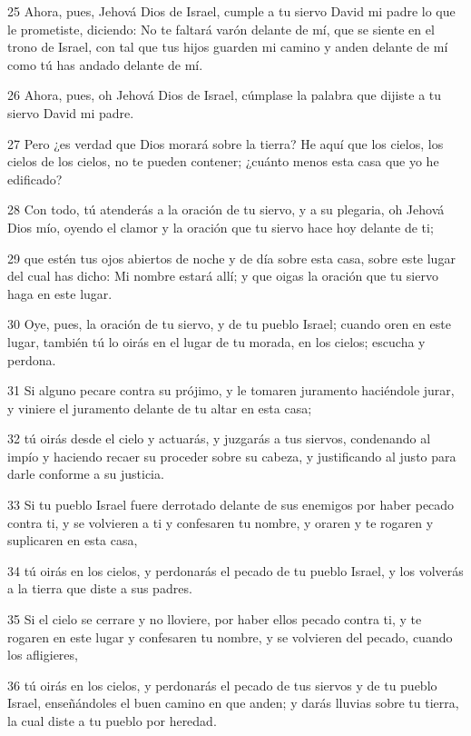 \par 25 Ahora, pues, Jehová Dios de Israel, cumple a tu siervo David mi padre lo que le prometiste, diciendo: No te faltará varón delante de mí, que se siente en el trono de Israel, con tal que tus hijos guarden mi camino y anden delante de mí como tú has andado delante de mí.
\par 26 Ahora, pues, oh Jehová Dios de Israel, cúmplase la palabra que dijiste a tu siervo David mi padre.
\par 27 Pero ¿es verdad que Dios morará sobre la tierra? He aquí que los cielos, los cielos de los cielos, no te pueden contener; ¿cuánto menos esta casa que yo he edificado? 
\par 28 Con todo, tú atenderás a la oración de tu siervo, y a su plegaria, oh Jehová Dios mío, oyendo el clamor y la oración que tu siervo hace hoy delante de ti;
\par 29 que estén tus ojos abiertos de noche y de día sobre esta casa, sobre este lugar del cual has dicho: Mi nombre estará allí; y que oigas la oración que tu siervo haga en este lugar.
\par 30 Oye, pues, la oración de tu siervo, y de tu pueblo Israel; cuando oren en este lugar, también tú lo oirás en el lugar de tu morada, en los cielos; escucha y perdona.
\par 31 Si alguno pecare contra su prójimo, y le tomaren juramento haciéndole jurar, y viniere el juramento delante de tu altar en esta casa;
\par 32 tú oirás desde el cielo y actuarás, y juzgarás a tus siervos, condenando al impío y haciendo recaer su proceder sobre su cabeza, y justificando al justo para darle conforme a su justicia.
\par 33 Si tu pueblo Israel fuere derrotado delante de sus enemigos por haber pecado contra ti, y se volvieren a ti y confesaren tu nombre, y oraren y te rogaren y suplicaren en esta casa,
\par 34 tú oirás en los cielos, y perdonarás el pecado de tu pueblo Israel, y los volverás a la tierra que diste a sus padres.
\par 35 Si el cielo se cerrare y no lloviere, por haber ellos pecado contra ti, y te rogaren en este lugar y confesaren tu nombre, y se volvieren del pecado, cuando los afligieres,
\par 36 tú oirás en los cielos, y perdonarás el pecado de tus siervos y de tu pueblo Israel, enseñándoles el buen camino en que anden; y darás lluvias sobre tu tierra, la cual diste a tu pueblo por heredad.
